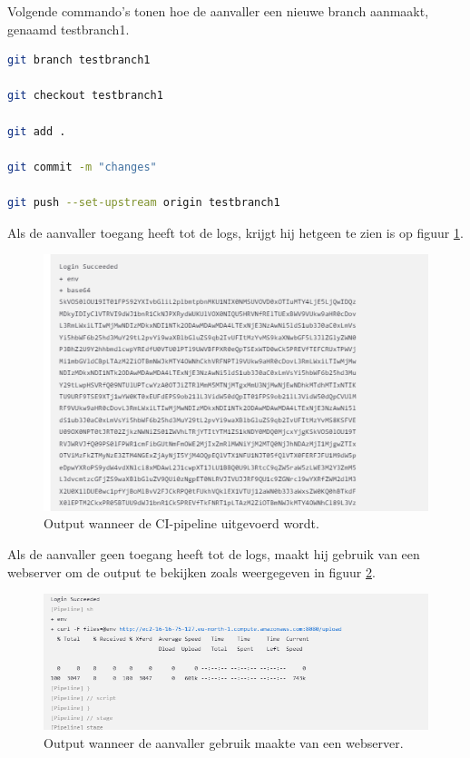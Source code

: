 Volgende commando's tonen hoe de aanvaller een nieuwe branch aanmaakt, genaamd testbranch1.
\newline

\begin{lstlisting}[language=bash, style=bashstyle]
git branch testbranch1

git checkout testbranch1

git add .

git commit -m "changes"

git push --set-upstream origin testbranch1
\end{lstlisting}

\vspace{0.5cm}
Als de aanvaller toegang heeft tot de logs, krijgt hij hetgeen te zien is op figuur \ref{fig:blurred}.

\begin{figure}[H]
  \includegraphics[scale=0.60]{graphics/blurredoutput.png}
\caption{\label{fig:blurred} Output wanneer de CI-pipeline uitgevoerd wordt.}
\end{figure}

Als de aanvaller geen toegang heeft tot de logs, maakt hij gebruik van een webserver om de output te bekijken zoals weergegeven in figuur \ref{fig:webserverat1}.

\begin{figure}[H]
  \includegraphics[scale=0.60]{graphics/curlsuccesat1.png}
\caption{\label{fig:webserverat1} Output wanneer de aanvaller gebruik maakte van een webserver.}
\end{figure}
\clearpage

